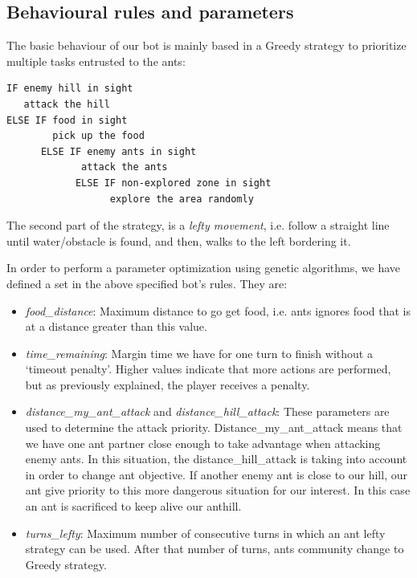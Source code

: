 \documentclass[runningheads]{llncs}
\begin{document}

\subsection{Behavioural rules and parameters}

The basic behaviour of our bot is mainly based in a Greedy strategy to prioritize multiple tasks entrusted to the ants:
\begin{verbatim}
IF enemy hill in sight
   attack the hill 
ELSE IF food in sight 
        pick up the food
	  ELSE IF enemy ants in sight
             attack the ants
		    ELSE IF non-explored zone in sight 
                  explore the area randomly
\end{verbatim}

The second part of the strategy, is a \textit{lefty movement}, i.e. follow a straight line until water/obstacle is found, and then, walks to the left bordering it.

 
In order to perform a parameter optimization using genetic algorithms, we have defined a set in the above specified bot's rules. They are:
\begin{itemize}
  \item {\em food\_distance}: Maximum distance to go get food, i.e. ants ignores food that is at a distance greater than this value.
  \item {\em time\_remaining}: Margin time we have for one turn to finish without a `timeout penalty'. Higher values indicate that more actions are performed, but as previously explained, the player receives a penalty.
  \item {\em distance\_my\_ant\_attack} and {\em distance\_hill\_attack}: These parameters are used to determine the attack priority.  Distance\_my\_ant\_attack means that we have one ant partner close enough to take advantage when attacking enemy ants. In this situation, the distance\_hill\_attack is taking into account in order to change ant objective. If another enemy ant is close to our hill, our ant give priority to this more dangerous situation for our interest. In this case an ant is sacrificed to keep alive our anthill.
  \item {\em turns\_lefty}: Maximum number of consecutive turns in which an ant lefty strategy can be used. After that number of turns, ants community change to Greedy strategy.

\end{itemize}
\end{document}

